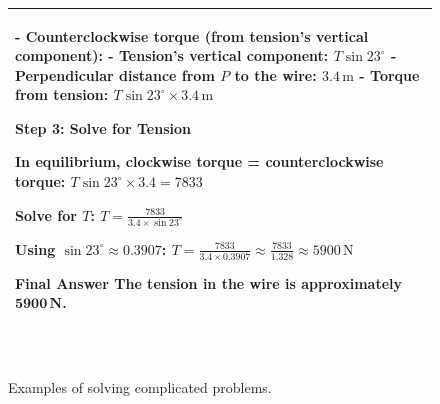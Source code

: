 \begin{figure}[!htbp]
\begin{tabular}{m{15cm}}
{\quad - Counterclockwise torque (from tension’s vertical component):  
  - Tension’s vertical component: $ T \sin 23^\circ $  
  - Perpendicular distance from $ P $ to the wire: $ 3.4 \, \text{m} $  
  - Torque from tension: $ T \sin 23^\circ \times 3.4 \, \text{m} $  


\textbf{Step 3: Solve for Tension} 

In equilibrium, clockwise torque = counterclockwise torque:  
$
T \sin 23^\circ \times 3.4 = 7833
$  

Solve for $ T $:  
$
T = \frac{7833}{3.4 \times \sin 23^\circ}
$  

Using $ \sin 23^\circ \approx 0.3907 $:  
$
T = \frac{7833}{3.4 \times 0.3907} \approx \frac{7833}{1.328} \approx 5900 \, \text{N}
$  


\textbf{Final Answer}  
The tension in the wire is approximately $ \boldsymbol{5900 \, \text{N}} $.
}\\
  \bottomrule
  \end{tabular}\\
\caption{Examples of \mimovl{} solving complicated problems.}
\label{fig:case_main}
\end{figure}
